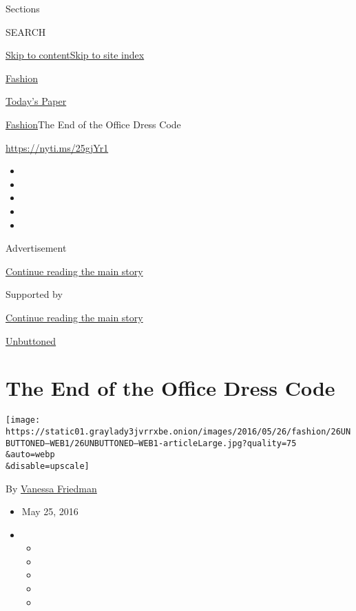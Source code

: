 Sections

SEARCH

\protect\hyperlink{site-content}{Skip to
content}\protect\hyperlink{site-index}{Skip to site index}

\href{https://www.nytimes3xbfgragh.onion/section/fashion}{Fashion}

\href{https://myaccount.nytimes3xbfgragh.onion/auth/login?response_type=cookie\&client_id=vi}{}

\href{https://www.nytimes3xbfgragh.onion/section/todayspaper}{Today's
Paper}

\href{/section/fashion}{Fashion}\textbar{}The End of the Office Dress
Code

\href{https://nyti.ms/25gjYr1}{https://nyti.ms/25gjYr1}

\begin{itemize}
\item
\item
\item
\item
\item
\end{itemize}

Advertisement

\protect\hyperlink{after-top}{Continue reading the main story}

Supported by

\protect\hyperlink{after-sponsor}{Continue reading the main story}

\href{/column/unbuttoned}{Unbuttoned}

\hypertarget{the-end-of-the-office-dress-code}{%
\section{The End of the Office Dress
Code}\label{the-end-of-the-office-dress-code}}

\texttt{[image: https://static01.graylady3jvrrxbe.onion/images/2016/05/26/fashion/26UNBUTTONED--WEB1/26UNBUTTONED--WEB1-articleLarge.jpg?quality=75\\\&auto=webp\\\&disable=upscale]}

By \href{https://www.nytimes3xbfgragh.onion/by/vanessa-friedman}{Vanessa
Friedman}

\begin{itemize}
\item
  May 25, 2016
\item
  \begin{itemize}
  \item
  \item
  \item
  \item
  \item
  \end{itemize}
\end{itemize}

